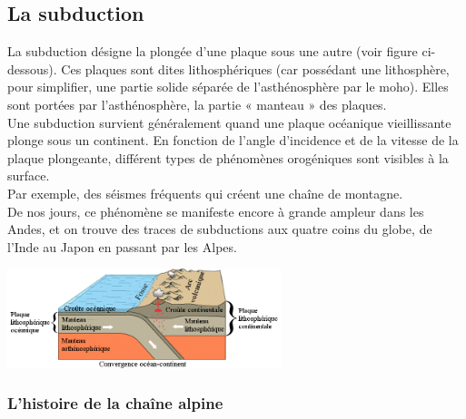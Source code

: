 \documentclass[a4paper,11pt]{article}
\begin{document}
\subsection{La subduction}

La subduction désigne la plongée d'une plaque sous une autre (voir figure ci-dessous). Ces plaques sont dites lithosphériques (car possédant une lithosphère, pour simplifier, une partie solide séparée de l'asthénosphère par le moho). Elles sont portées par l'asthénosphère, la partie « manteau » des plaques.\\
Une subduction survient généralement quand une plaque océanique vieillissante plonge sous un continent. 
En fonction de l'angle d'incidence et de la vitesse de la plaque plongeante, différent types de phénomènes orogéniques sont visibles à la surface. \\
Par exemple, des séismes fréquents qui créent une chaîne de montagne.\\
De nos jours, ce phénomène se manifeste encore à grande ampleur dans les Andes, et on trouve des traces de subductions aux quatre coins du globe, de l'Inde au Japon en passant par les Alpes. \\

\begin{center}
  \includegraphics[width=8cm]{Images/subduction_2.png}
\end{center}

\subsubsection{L'histoire de la chaîne alpine}
\end{document}
